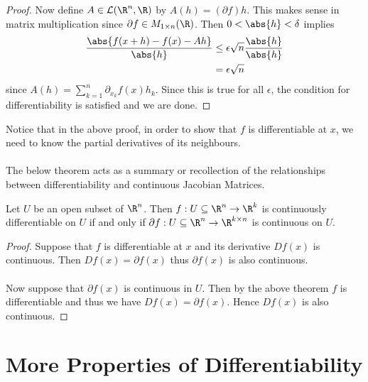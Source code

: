 \documentclass[a4paper]{article}
\begin{document}
\begin{thm}{}{}
\begin{proof}
Now define $A\in\mathcal{L}(\R^n,\R)$ by $A(h)=(\partial f)h$. This makes sense in matrix multiplication since $\partial f\in M_{1\times n}(\R)$. Then $0<\abs{h}<\delta$ implies 
\begin{align*}
\frac{\abs{f(x+h)-f(x)-Ah}}{\abs{h}}&\leq\epsilon\sqrt{n}\frac{\abs{h}}{\abs{h}}\\
&=\epsilon\sqrt{n}
\end{align*} since $A(h)=\sum_{k=1}^n\partial_{x_k}f(x)h_k$. Since this is true for all $\epsilon$, the condition for differentiability is satisfied and we are done. 
\end{proof}
\end{thm}

Notice that in the above proof, in order to show that $f$ is differentiable at $x$, we need to know the partial derivatives of its neighbours. \\~\\

The below theorem acts as a summary or recollection of the relationships between differentiability and continuous Jacobian Matrices. 

\begin{thm}{}{} Let $U$ be an open subset of $\R^n$. Then $f:U\subseteq\R^n\to\R^k$ is continuously differentiable on $U$ if and only if $\partial f:U\subseteq\R^n\to\R^{k\times n}$ is continuous on $U$. \tcbline
\begin{proof}
Suppose that $f$ is differentiable at $x$ and its derivative $Df(x)$ is continuous. Then $Df(x)=\partial f(x)$ thus $\partial f(x)$ is also continuous. \\~\\
Now suppose that $\partial f(x)$ is continuous in $U$. Then by the above theorem $f$ is differentiable and thus we have $Df(x)=\partial f(x)$. Hence $Df(x)$ is also continuous. 
\end{proof}
\end{thm}

\pagebreak
\section{More Properties of Differentiability}
\end{document}
